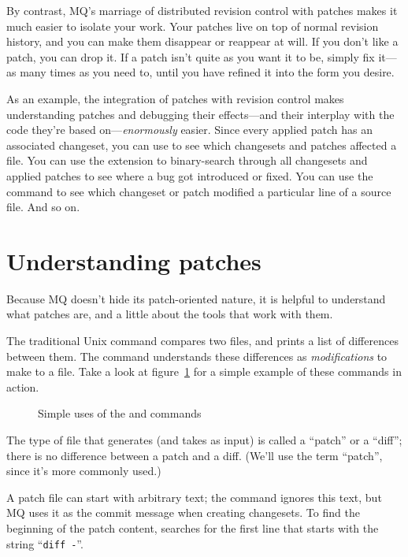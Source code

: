 By contrast, MQ's marriage of distributed revision control with
patches makes it much easier to isolate your work.  Your patches live
on top of normal revision history, and you can make them disappear or
reappear at will.  If you don't like a patch, you can drop it.  If a
patch isn't quite as you want it to be, simply fix it---as many times
as you need to, until you have refined it into the form you desire.

As an example, the integration of patches with revision control makes
understanding patches and debugging their effects---and their
interplay with the code they're based on---\emph{enormously} easier.
Since every applied patch has an associated changeset, you can use
 to see which changesets and patches
affected a file.  You can use the  extension to
binary-search through all changesets and applied patches to see where
a bug got introduced or fixed.  You can use the 
command to see which changeset or patch modified a particular line of
a source file.  And so on.

\section{Understanding patches}
\label{sec:mq:patch}

Because MQ doesn't hide its patch-oriented nature, it is helpful to
understand what patches are, and a little about the tools that work
with them.

The traditional Unix  command compares two files, and
prints a list of differences between them. The  command
understands these differences as \emph{modifications} to make to a
file.  Take a look at figure~\ref{ex:mq:diff} for a simple example of
these commands in action.

\begin{figure}[ht]
  \caption{Simple uses of the  and  commands}
  \label{ex:mq:diff}
\end{figure}

The type of file that  generates (and 
takes as input) is called a ``patch'' or a ``diff''; there is no
difference between a patch and a diff.  (We'll use the term ``patch'',
since it's more commonly used.)

A patch file can start with arbitrary text; the 
command ignores this text, but MQ uses it as the commit message when
creating changesets.  To find the beginning of the patch content,
 searches for the first line that starts with the
string ``\texttt{diff~-}''.

